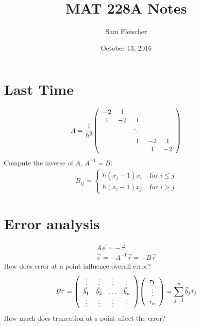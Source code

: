 \documentclass{article}
\title{MAT 228A Notes}
\author{Sam Fleischer}
\date{October 13, 2016}
\begin{document}
    \maketitle

    \section{Last Time}
        \begin{align}
            A = \frac{1}{h^2}\qty(\begin{array}{ccccc}
                -2 & 1 & & & \\
                1 & -2 & 1 & \\
                & & \ddots & & \\
                & & 1 & -2 & 1 \\
                & & & 1 & -2
            \end{array})
        \end{align}
        Compute the inverse of $A$, $A^{-1} = B$:
        \begin{align}
            B_{ij} = \begin{cases}
                h(x_j - 1)x_i & \text{ for } i \leq j \\
                h(x_i - 1)x_j & \text{ for } i > j
            \end{cases}
        \end{align}

    \section{Error analysis}
        \begin{align}
            A\vec{e} = -\vec{\tau} \\
            \vec{e} = -A^{-1}\vec{\tau} = -B\vec{\tau}
        \end{align}
        How does error at a point influence overall error?
        \begin{align}
            B\tau = \qty(\begin{array}{cccc}
                \vdots & \vdots & \vdots & \vdots \\
                \vec{b}_1 & \vec{b}_2 & \dots & \vec{b}_n \\
                \vdots & \vdots & \vdots & \vdots
            \end{array})\qty(\begin{array}{c}
                \tau_1 \\ \vdots \\ \tau_n
            \end{array}) = \sum_{j=1}^n \vec{b}_j \tau_j
        \end{align}
        How much does truncation at a point affect the error?
\end{document}
